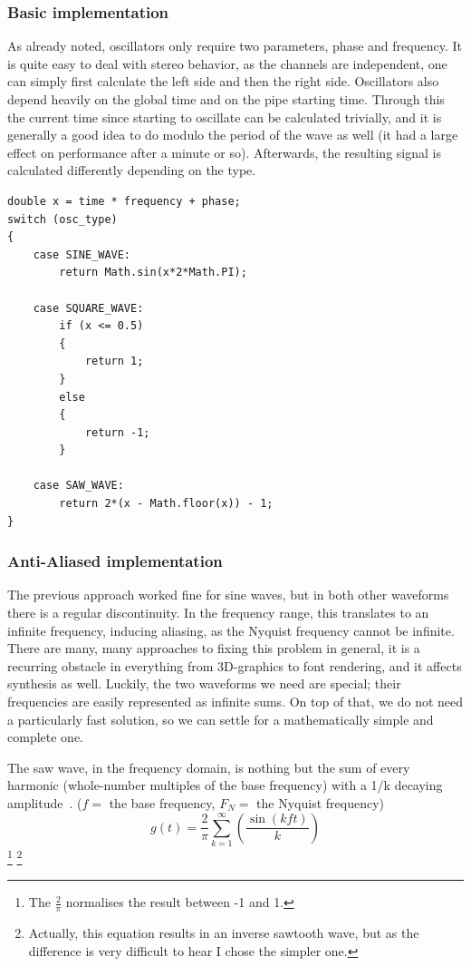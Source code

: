 \documentclass[11pt,a4paper]{article}
\begin{document}
\subsubsection{Basic implementation}

As already noted, oscillators only require two parameters, phase and frequency. It is quite easy to deal with stereo behavior, as the channels are independent, one can simply first calculate the left side and then the right side. Oscillators also depend heavily on the global time and on the pipe starting time. Through this the current time since starting to oscillate can be calculated trivially, and it is generally a good idea to do modulo the period of the wave as well (it had a large effect on performance after a minute or so). Afterwards, the resulting signal is calculated differently depending on the type.
\\\begin{minipage}{\linewidth}
\begin{lstlisting}
double x = time * frequency + phase;
switch (osc_type)
{
	case SINE_WAVE:
		return Math.sin(x*2*Math.PI);

	case SQUARE_WAVE:
		if (x <= 0.5)
		{
		    return 1;
		}
		else
		{
		    return -1;
		}

	case SAW_WAVE:
		return 2*(x - Math.floor(x)) - 1;
}
\end{lstlisting}
\end{minipage}

\subsubsection{Anti-Aliased implementation}

The previous approach worked fine for sine waves, but in both other waveforms there is a regular discontinuity. In the frequency range, this translates to an infinite frequency, inducing aliasing, as the Nyquist frequency cannot be infinite.
There are many, many approaches to fixing this problem in general, it is a recurring obstacle in everything from 3D-graphics to font rendering, and it affects synthesis as well. Luckily, the two waveforms we need are special; their frequencies are easily represented as infinite sums. On top of that, we do not need a particularly fast solution, so we can settle for a mathematically simple and complete one.

The saw wave, in the frequency domain, is nothing but the sum of every harmonic (whole-number multiples of the base frequency) with a 1/k decaying amplitude~\cite{WolframSaw}.
(\(f = \) the base frequency, \(F_N = \) the Nyquist frequency)
\begin{equation}
g(t) = \frac{2}{\pi}\sum\limits_{k=1}^\infty{\left(\frac{\sin(kft)}{k}\right)}
\end{equation}
\footnote{The \(\frac{2}{\pi}\) normalises the result between -1 and 1.}
\footnote{Actually, this equation results in an inverse sawtooth wave, but as the difference is very difficult to hear I chose the simpler one.}
\end{document}
